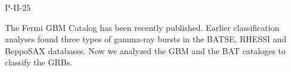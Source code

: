 P-II-25


\bigskip



\bigskip

\noindent The Fermi GBM Catalog has been recently published. Earlier classification analyses found three types of gamma-ray bursts in the BATSE, RHESSI and BeppoSAX databases. Now we analyzed the GBM and the BAT cataloges to classify the GRBs.
